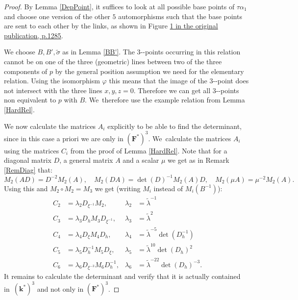 \documentclass[10pt,a4paper]{amsart}
\providecommand{\nobreakdash}{\nobreak\hbox{-}}
\theoremstyle{definition}
\newcommand{\kk}{{\boldsymbol{k}}}
\newcommand{\FF}{{\boldsymbol{F}}}
\begin{document}
\begin{proof}
By Lemma \ref{DepPoint}, it suffices to look at all possible base points of $\tau \alpha_1$ and choose one version of the other $5$ automorphisms such that the base points are sent to each other by the links, as shown in Figure \href{https://jep.centre-mersenne.org/articles/10.5802/jep.347/}{1 in the original publication, p.1285}.

We choose $B,B', \tilde \sigma$ as in Lemma \ref{BB'}. The $3$\nobreakdash-points occurring in this relation cannot be on one of the three (geometric) lines between two of the three components of $p$ by the general position assumption we need for the elementary relation. Using the isomorphism $\varphi$ this means that the image of the $3$\nobreakdash-point does not intersect with the three lines $x,y,z = 0$. Therefore we can get all $3$\nobreakdash-points non equivalent to $p$ with $B$. We~therefore use the example relation from Lemma \ref{HardRel}.

We now calculate the matrices $A_i$ explicitly to be able to find the determinant, since in this case a priori we are only in $(\FF^*)^3$. We~calculate the matrices $A_i$ using the matrices $C_i$ from the proof of Lemma \ref{HardRel}. Note that for a diagonal matrix $D$, a general matrix $A$ and a scalar $\mu$ we get as in Remark \ref{RemDiag} that:
\[
M_2(A D) = D^{-2} M_2(A),
\quad
M_2(DA) = \det(D)^{-1} M_2(A) D,
\quad
M_2(\mu A) = \mu^{-2} M_2(A).
\]
Using this and $M_2 \circ M_2 = M_3$ we get (writing $M_i$ instead of $M_i(B^{-1})$):
\begin{align*}
C_2 &= \lambda_2 D_{\xi^{-1}} M_2, & \lambda_2 &= \tilde \lambda^{-1}
\\
C_3 &= \lambda_3 D_h M_3 D_{\xi^{-1}}, &\lambda_3 &= \tilde \lambda^2
\\
C_4 &= \lambda_4 D_{\xi} M_4 D_h, &\lambda_4 &= \tilde \lambda^{-5} \det(D_h^{-1})
\\
C_5 &= \lambda_5 D_h^{-1} M_5 D_{\xi}, &\lambda_5 &= \tilde \lambda^{10} \det(D_h)^2
\\
C_6 &= \lambda_6 D_{\xi^{-3}} M_6 D_h^{-1}, &\lambda_6 &=\tilde \lambda^{-22} \det(D_h)^{-3}.
\end{align*}
It remains to calculate the determinant and verify that it is actually contained in~$(\kk^*)^3$ and not only in $(\FF^*)^3$.


\end{proof}
\end{document}
